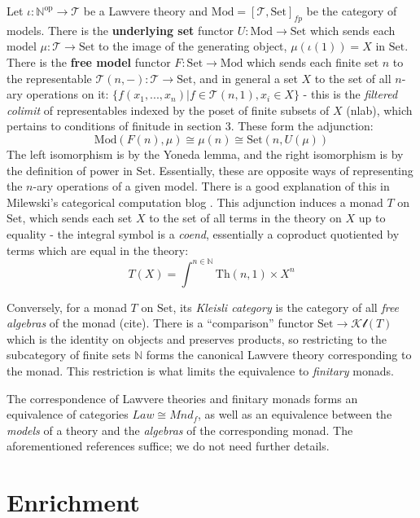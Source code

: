 \documentclass[a4paper,UKenglish]{article}
\newcommand{\Th}{\mathrm{Th}}
\newcommand{\Set}{\mathrm{Set}}
\newcommand{\Mod}{\mathrm{Mod}}
\newcommand{\op}{\mathrm{op}}
\newcommand{\NN}{\mathbb{N}}
\newcommand{\T}{\mathscr{T}}
\newcommand{\Kl}{\mathscr{Kl}}
\begin{document}
Let $\iota: \NN^\op \to \T$ be a Lawvere theory and $\Mod = [\T,\Set]_{fp}$ be the category of models. There is the \textbf{underlying set} functor $U:\Mod \to \Set$ which sends each model $\mu: \T \to \Set$ to the image of the generating object, $\mu(\iota(1)) = X$ in $\Set$. There is the \textbf{free model} functor $F:\Set \to \Mod$ which sends each finite set $n$ to the representable $\T(n,-):\T \to \Set$, and in general a set $X$ to the set of all $n$-ary operations on it: $\{f(x_1,...,x_n)|f\in \T(n,1), x_i\in X\}$ - this is the \textit{filtered colimit} of representables indexed by the poset of finite subsets of $X$ (nlab), which pertains to conditions of finitude in section 3. These form the adjunction: $$\Mod(F(n),\mu) \cong \mu(n) \cong \Set(n,U(\mu))$$ The left isomorphism is by the Yoneda lemma, and the right isomorphism is by the definition of power in $\Set$. Essentially, these are opposite ways of representing the $n$-ary operations of a given model. There is a good explanation of this in Milewski's categorical computation blog \cite{milew}. This adjunction induces a monad $T$ on $\Set$, which sends each set $X$ to the set of all terms in the theory on $X$ up to equality - the integral symbol is a \textit{coend}, essentially a coproduct quotiented by terms which are equal in the theory: $$T(X) = \int^{n\in \NN} \Th(n,1) \times X^n$$

Conversely, for a monad $T$ on $\Set$, its \textit{Kleisli category} is the category of all \textit{free algebras} of the monad (cite). There is a ``comparison'' functor $\Set \to \Kl(T)$ which is the identity on objects and preserves products, so restricting to the subcategory of finite sets $\NN$ forms the canonical Lawvere theory corresponding to the monad. This restriction is what limits the equivalence to \textit{finitary} monads.

The correspondence of Lawvere theories and finitary monads forms an equivalence of categories $Law \cong Mnd_f$, as well as an equivalence between the \textit{models} of a theory and the \textit{algebras} of the corresponding monad. The aforementioned references suffice; we do not need further details. 

\section{Enrichment}
\end{document}
